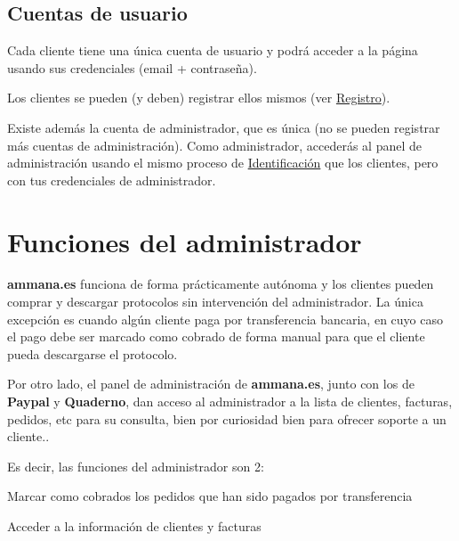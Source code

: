 \documentclass[12pt, spanish]{article}
\begin{document}

    \subsection{Cuentas de usuario}

        Cada cliente tiene una única cuenta de usuario y podrá acceder a la página usando
    sus credenciales (email + contraseña).

        Los clientes se pueden (y deben) registrar ellos mismos (ver \hyperref[sec:registro]{Registro}).
    
        Existe además la cuenta de administrador, que es única (no se pueden registrar
    más cuentas de administración). Como administrador, accederás al panel de administración
    usando el mismo proceso de \hyperref[sec:login]{Identificación} que los clientes, pero con
    tus credenciales de administrador.


    \section{Funciones del administrador}

            \textbf{ammana.es} funciona de forma prácticamente autónoma y los clientes pueden
        comprar y descargar protocolos sin intervención del administrador. La única
        excepción es cuando algún cliente paga por transferencia bancaria, en cuyo
        caso el pago debe ser marcado como cobrado de forma manual para que el cliente
        pueda descargarse el protocolo.

            Por otro lado, el panel de administración de \textbf{ammana.es}, junto con los de
        \textbf{Paypal} y \textbf{Quaderno}, dan acceso al administrador a la lista de clientes,
        facturas, pedidos, etc para su consulta, bien por curiosidad bien para ofrecer soporte
        a un cliente..

        Es decir, las funciones del administrador son 2:

        \begin{steps}
            \item Marcar como cobrados los pedidos que han sido pagados por transferencia
            \item Acceder a la información de clientes y facturas
        \end{steps}
\end{document}
